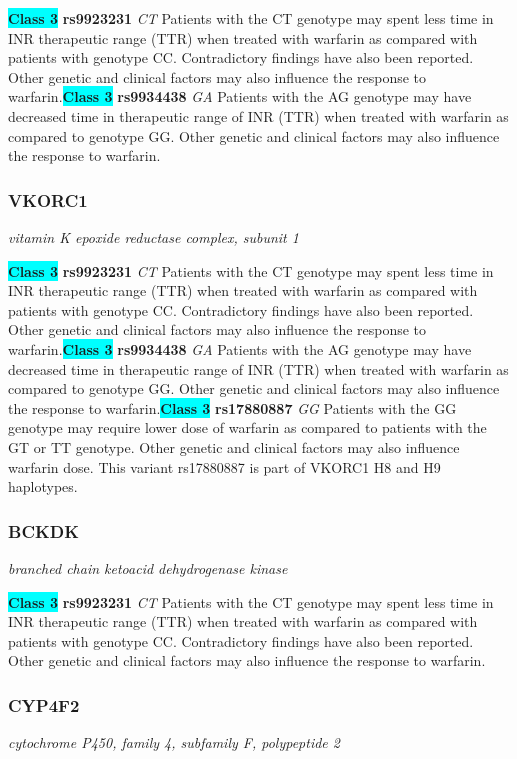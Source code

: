\documentclass{report}
\begin{document}
\textbf{\colorbox{cyan} {Class 3}} \textbf{ rs9923231 } \textit{ CT }
Patients with the CT genotype may spent less time in INR therapeutic range (TTR) when treated with warfarin as compared with patients with genotype CC. Contradictory findings have also been reported. Other genetic and clinical factors may also influence the response to warfarin.\newline\textbf{\colorbox{cyan} {Class 3}} \textbf{ rs9934438 } \textit{ GA }
Patients with the AG genotype may have decreased time in therapeutic range of INR (TTR) when treated with warfarin as compared to genotype GG. Other genetic and clinical factors may also influence the response to warfarin.\newline\subsubsection{ VKORC1 }
\textit{ vitamin K epoxide reductase complex, subunit 1 }

\textbf{\colorbox{cyan} {Class 3}} \textbf{ rs9923231 } \textit{ CT }
Patients with the CT genotype may spent less time in INR therapeutic range (TTR) when treated with warfarin as compared with patients with genotype CC. Contradictory findings have also been reported. Other genetic and clinical factors may also influence the response to warfarin.\newline\textbf{\colorbox{cyan} {Class 3}} \textbf{ rs9934438 } \textit{ GA }
Patients with the AG genotype may have decreased time in therapeutic range of INR (TTR) when treated with warfarin as compared to genotype GG. Other genetic and clinical factors may also influence the response to warfarin.\newline\textbf{\colorbox{cyan} {Class 3}} \textbf{ rs17880887 } \textit{ GG }
Patients with the GG genotype may require lower dose of warfarin as compared to patients with the GT or TT genotype. Other genetic and clinical factors may also influence warfarin dose. This variant rs17880887 is part of VKORC1 H8 and H9 haplotypes.\newline\subsubsection{ BCKDK }
\textit{ branched chain ketoacid dehydrogenase kinase }

\textbf{\colorbox{cyan} {Class 3}} \textbf{ rs9923231 } \textit{ CT }
Patients with the CT genotype may spent less time in INR therapeutic range (TTR) when treated with warfarin as compared with patients with genotype CC. Contradictory findings have also been reported. Other genetic and clinical factors may also influence the response to warfarin.\newline\subsubsection{ CYP4F2 }
\textit{ cytochrome P450, family 4, subfamily F, polypeptide 2 }
\end{document}
